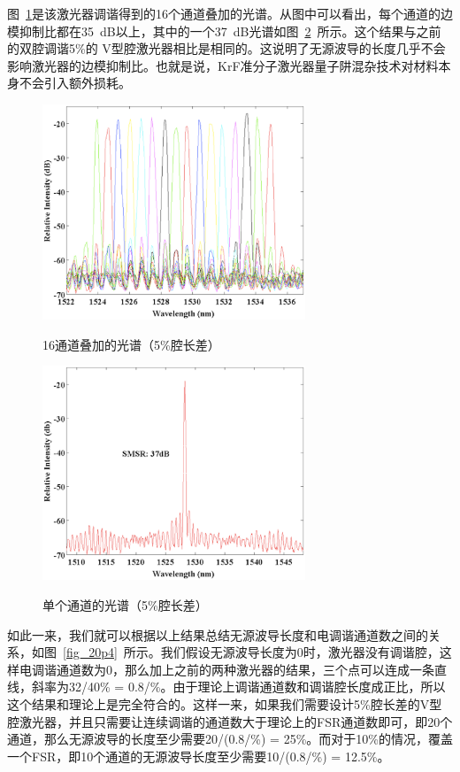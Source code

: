 \documentclass{ZJUthesis}
\begin{document}
图~\ref{fig_20p2}是该激光器调谐得到的16个通道叠加的光谱。从图中可以看出，每个通道的边模抑制比都在35~dB以上，其中的一个37~dB光谱如图~\ref{fig_20p3}~所示。这个结果与之前的双腔调谐5\%的 V型腔激光器相比是相同的。这说明了无源波导的长度几乎不会影响激光器的边模抑制比。也就是说，KrF准分子激光器量子阱混杂技术对材料本身不会引入额外损耗。

\begin{figure}[htbp]
  \centering
  \includegraphics[width=0.7\textwidth]{./Pictures/20p2.eps}\\
  \caption{16通道叠加的光谱（5\%腔长差）}
  \label{fig_20p2}
\end{figure}

\begin{figure}[htbp]
  \centering
  \includegraphics[width=0.7\textwidth]{./Pictures/20p3.eps}\\
  \caption{单个通道的光谱（5\%腔长差）}
  \label{fig_20p3}
\end{figure}

如此一来，我们就可以根据以上结果总结无源波导长度和电调谐通道数之间的关系，如图~\ref{fig_20p4}~所示。我们假设无源波导长度为0时，激光器没有调谐腔，这样电调谐通道数为0，那么加上之前的两种激光器的结果，三个点可以连成一条直线，斜率为32/40\% = 0.8/\%。由于理论上调谐通道数和调谐腔长度成正比，所以这个结果和理论上是完全符合的。这样一来，如果我们需要设计5\%腔长差的V型腔激光器，并且只需要让连续调谐的通道数大于理论上的FSR通道数即可，即20个通道，那么无源波导的长度至少需要20/(0.8/\%) = 25\%。而对于10\%的情况，覆盖一个FSR，即10个通道的无源波导长度至少需要10/(0.8/\%) = 12.5\%。
\end{document}
